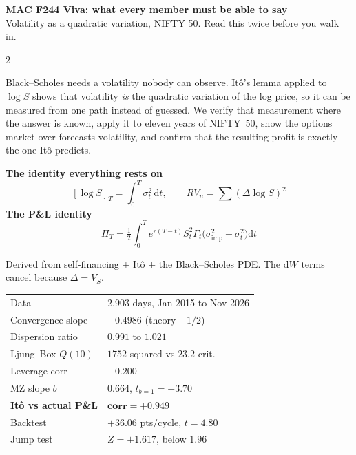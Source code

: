 \documentclass[12pt,a4paper]{extarticle}
\newcommand{\dd}{\mathrm{d}}
\newcommand{\half}{\tfrac{1}{2}}
\newcommand{\si}{\sigma_{\mathrm{imp}}}
\begin{document}
\begin{center}
{\large\bfseries MAC F244 Viva: what every member must be able to say}\\
{\footnotesize Volatility as a quadratic variation, NIFTY 50. Read this twice before you walk in.}
\end{center}
\vspace{-0.3em}

\begin{multicols}{2}

\begin{kb}
\footnotesize
Black--Scholes needs a volatility nobody can observe. It\^o's lemma applied to $\log S$ shows
that volatility \emph{is} the quadratic variation of the log price, so it can be measured from
one path instead of guessed. We verify that measurement where the answer is known, apply it to
eleven years of NIFTY~50, show the options market over-forecasts volatility, and confirm that
the resulting profit is exactly the one It\^o predicts.
\end{kb}

\textbf{\footnotesize The identity everything rests on}
\vspace{-0.4em}
\[[\log S]_T=\int_0^T\sigma_t^2\,\dd t,\qquad RV_n=\sum(\Delta\log S)^2\]
\vspace{-1.2em}
\textbf{\footnotesize The P\&L identity}
\vspace{0.5em}
\[\Pi_T=\half\int_0^T e^{r(T-t)}S_t^2\Gamma_t\big(\si^2-\sigma_t^2\big)\dd t\]
\vspace{-1.0em}

{\footnotesize Derived from self-financing $+$ It\^o $+$ the Black--Scholes PDE. The $\dd W$
terms cancel because $\Delta=V_S$.}

\begin{kb}
\scriptsize
\begin{tabular}{@{}ll@{}}
Data & 2,903 days, Jan 2015 to Nov 2026\\
Convergence slope & $-0.4986$ (theory $-1/2$)\\
Dispersion ratio & $0.991$ to $1.021$\\
Ljung--Box $Q(10)$ & $1752$ squared vs $23.2$ crit.\\
Leverage corr & $-0.200$\\
MZ slope $b$ & $0.664$, $t_{b=1}=-3.70$\\
\textbf{It\^o vs actual P\&L} & $\mathbf{corr=+0.949}$\\
Backtest & $+36.06$ pts/cycle, $t=4.80$\\
Jump test & $Z=+1.617$, below $1.96$\\
\end{tabular}
\end{kb}


\end{multicols}
\end{document}
